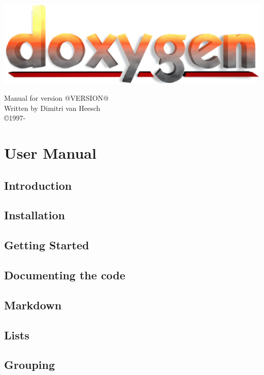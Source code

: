 \documentclass{book}
\newcommand{\+}{\discretionary{\mbox{\scriptsize$\hookleftarrow$}}{}{}}
\newcommand{\thisyear}{\the\year}
\begin{document}
\begin{titlepage}
\includegraphics[width=\textwidth]{doxygen_logo}
\begin{center}
Manual for version @VERSION@\\[2ex]
Written by Dimitri van Heesch\\[2ex]
\copyright 1997-\thisyear
\end{center}
\end{titlepage}
\clearemptydoublepage
\tableofcontents
\clearemptydoublepage
{}
\part{User Manual}
\chapter{Introduction}\label{intro}\hypertarget{intro}{}
\chapter{Installation}\label{install}\hypertarget{install}{}
\chapter{Getting Started}\label{starting}\hypertarget{starting}{}
\chapter{Documenting the code}\label{docblocks}\hypertarget{docblocks}{}
\chapter{Markdown}\label{markdown}\hypertarget{markdown}{}
\chapter{Lists}\label{lists}\hypertarget{lists}{}
\chapter{Grouping}\label{grouping}\hypertarget{grouping}{}
\end{document}
